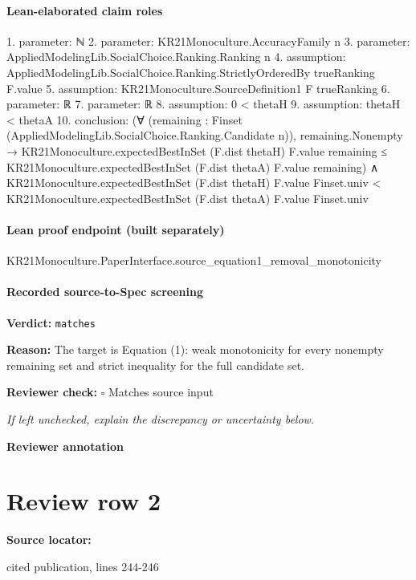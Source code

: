 \documentclass[10pt]{article}
\newcommand{\reviewerbox}{%
  \par\noindent\fbox{\parbox{0.96\linewidth}{\rule{0pt}{0.38in}}}\par
}
\newcommand{\reviewmatch}[1]{%
  \par\noindent\textbf{Reviewer check:} $\square$\; #1\par
  \noindent\emph{If left unchecked, explain the discrepancy or uncertainty below.}\par
}
\begin{document}
\paragraph{Lean-elaborated claim roles}\begin{ReviewVerbatim}
1. parameter: ℕ
2. parameter: KR21Monoculture.AccuracyFamily n
3. parameter: AppliedModelingLib.SocialChoice.Ranking.Ranking n
4. assumption: AppliedModelingLib.SocialChoice.Ranking.StrictlyOrderedBy trueRanking F.value
5. assumption: KR21Monoculture.SourceDefinition1 F trueRanking
6. parameter: ℝ
7. parameter: ℝ
8. assumption: 0 < thetaH
9. assumption: thetaH < thetaA
10. conclusion: (∀ (remaining : Finset (AppliedModelingLib.SocialChoice.Ranking.Candidate n)),
    remaining.Nonempty →
      KR21Monoculture.expectedBestInSet (F.dist thetaH) F.value remaining ≤
        KR21Monoculture.expectedBestInSet (F.dist thetaA) F.value remaining) ∧
  KR21Monoculture.expectedBestInSet (F.dist thetaH) F.value Finset.univ <
    KR21Monoculture.expectedBestInSet (F.dist thetaA) F.value Finset.univ
\end{ReviewVerbatim}

\paragraph{Lean proof endpoint (built separately)}\begin{ReviewVerbatim}
KR21Monoculture.PaperInterface.source_equation1_removal_monotonicity
\end{ReviewVerbatim}

\paragraph{Recorded source-to-Spec screening}
\textbf{Verdict:} \texttt{matches}
\\
{\raggedright
\textbf{Reason:} The target is Equation (1):\allowbreak{} weak monotonicity for every nonempty remaining set and strict inequality for the full candidate set.\allowbreak{}
\par}
\reviewmatch{Matches source input}
\noindent\textbf{Reviewer annotation}\par
\reviewerbox
\clearpage
\hypertarget{source-claim-f88d6727dfcb8617}{}
\section*{Review row 2}
\textbf{Source locator:} {\footnotesize\raggedright cited publication, lines 244-\allowbreak{}246\par}
\end{document}
